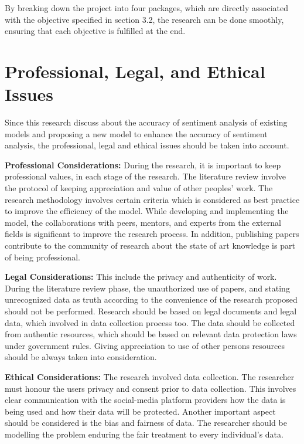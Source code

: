 \documentclass[a4paper,onecolumn,11pt]{article}
\begin{document}
By breaking down the project into four packages, which are directly associated with the objective specified in section 3.2, the research can be done smoothly, ensuring that each objective is fulfilled at the end.

\vspace{15pt}


\section{Professional, Legal, and Ethical Issues}

	Since this research discuss about the accuracy of sentiment analysis of existing models and proposing a new model to enhance the accuracy of sentiment analysis, the professional, legal and ethical issues should be taken into account.

\textbf{Professional Considerations:}
	During the research, it is important to keep professional values, in each stage of the research. The literature review involve the protocol of keeping appreciation and value of other peoples’ work. The research methodology involves certain criteria which is considered as best practice to improve the efficiency of the model. While developing and implementing the model, the collaborations with peers, mentors, and experts from the external fields is significant to improve the research process. In addition, publishing papers contribute to the community of research about the state of art knowledge is part of being professional. 

\textbf{Legal Considerations:}
	This include the privacy and authenticity of work. During the literature review phase, the unauthorized use of papers, and stating unrecognized data as truth according to the convenience of the research proposed should not be performed. Research should be based on legal documents and legal data, which involved in data collection process too. The data should be collected from authentic resources, which should be based on relevant data protection laws under government rules. Giving appreciation to use of other persons resources should be always taken into consideration.

\textbf{Ethical Considerations:}
	The research involved data collection. The researcher must honour the users privacy and consent prior to data collection. This involves clear communication with the social-media platform providers how the data is being used and how their data will be protected. Another important aspect should be considered is the bias and fairness of data. The researcher should be modelling the problem enduring the fair treatment to every individual’s data.
\end{document}
